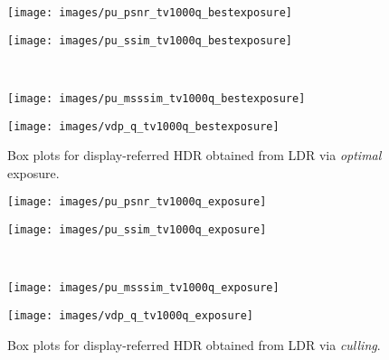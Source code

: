 \documentclass{egpubl}
\begin{document}
\begin{figure}[htb]
    \centering
    \begin{minipage}{0.48\linewidth}
    \centering
        \texttt{[image: images/pu\_psnr\_tv1000q\_bestexposure]}
    \end{minipage}
    \begin{minipage}{0.48\linewidth}
    \centering
        \texttt{[image: images/pu\_ssim\_tv1000q\_bestexposure]}
    \end{minipage}\\
    \begin{minipage}{0.48\linewidth}
    \centering
        \texttt{[image: images/pu\_msssim\_tv1000q\_bestexposure]}
    \end{minipage}
    \begin{minipage}{0.48\linewidth}
    \centering
        \texttt{[image: images/vdp\_q\_tv1000q\_bestexposure]}
    \end{minipage}
    \caption{Box plots for display-referred HDR obtained from LDR via
    \textit{optimal} exposure.}\label{fig:boxplots_tv_optimal}
\end{figure}
\begin{figure}[htb]
    \centering
    \begin{minipage}{0.48\linewidth}
    \centering
        \texttt{[image: images/pu\_psnr\_tv1000q\_exposure]}
    \end{minipage}
    \begin{minipage}{0.48\linewidth}
    \centering
        \texttt{[image: images/pu\_ssim\_tv1000q\_exposure]}
    \end{minipage}\\
    \begin{minipage}{0.48\linewidth}
    \centering
        \texttt{[image: images/pu\_msssim\_tv1000q\_exposure]}
    \end{minipage}
    \begin{minipage}{0.48\linewidth}
    \centering
        \texttt{[image: images/vdp\_q\_tv1000q\_exposure]}
    \end{minipage}
    \caption{Box plots for display-referred HDR obtained from LDR via
    \textit{culling}.}\label{fig:boxplots_tv_culling}
\end{figure}
\end{document}
